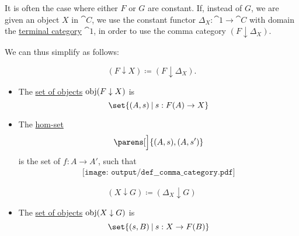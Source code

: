 \begin{definition}
\begin{thmenum}
     It is often the case where either \( F \) or \( G \) are constant. If, instead of \( G \), we are given an object \( X \) in \( \cat{C} \), we use the constant functor \( \Delta_X: \cat{1} \to \cat{C} \) with domain the \hyperref[def:universal_categories]{terminal category} \( \cat{1} \), in order to use the comma category \( (F \downarrow \Delta_X) \).

    We can thus simplify  as follows:

    \begin{minipage}[t]{0.43\textwidth}
      \begin{equation*}
        (F \downarrow X) \coloneqq (F \downarrow \Delta_X).
      \end{equation*}

      \begin{itemize}
        \item The \hyperref[def:category/objects]{set of objects} \( \operatorname{obj}(F \downarrow X) \) is
        \begin{equation*}
          \set{ (A, s) \given s: F(A) \to X }
        \end{equation*}

        \item The \hyperref[def:category/morphisms]{hom-set}
        \begin{equation*}
          [F \downarrow X]\parens[\Big]{ (A, s), (A, s') }
        \end{equation*}
        is the set of \( f: A \to A' \), such that
        \begin{equation}\label{eq:def:comma_category/fixed/right}
          \begin{aligned}
            \texttt{[image: output/def\_\_comma\_category.pdf]}
          \end{aligned}
        \end{equation}
      \end{itemize}
    \end{minipage}
    \begin{minipage}[t]{0.43\textwidth}
      \begin{equation*}
        (X \downarrow G) \coloneqq (\Delta_X \downarrow G)
      \end{equation*}

      \begin{itemize}
        \item The \hyperref[def:category/objects]{set of objects} \( \operatorname{obj}(X \downarrow G) \) is
        \begin{equation*}
          \set{ (s, B) \given s: X \to F(B) }
        \end{equation*}


\end{itemize}
\end{minipage}
\end{thmenum}
\end{definition}
